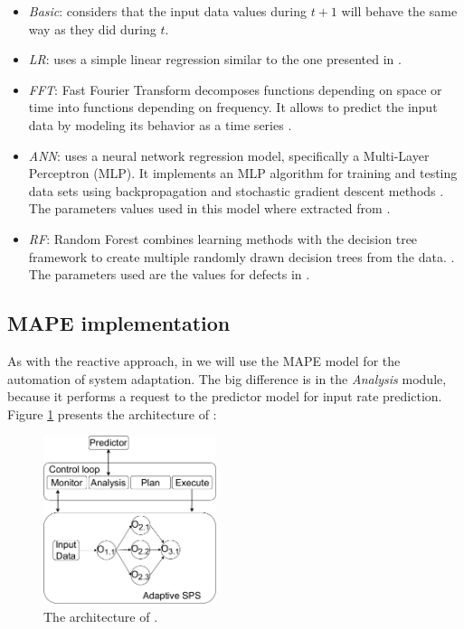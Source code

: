 \begin{itemize}
    \item \textit{Basic}: considers that the input data values during $t+1$ will behave the same way as they did during $t$.
    \item \textit{LR}: uses a simple linear regression similar to the one presented in \citep{montgomery2021introduction}.
    \item \textit{FFT}: Fast Fourier Transform decomposes functions depending on space or time into functions depending on frequency. It allows to predict the input data by modeling its behavior as a time series \citep{nussbaumer1982fast}.
    \item \textit{ANN}: uses a neural network regression model, specifically a Multi-Layer Perceptron (MLP). It implements an MLP algorithm for training and testing data sets using backpropagation and stochastic gradient descent methods \citep{riedmiller2014multi}. The parameters values used in this model where extracted from \citep{PedregosaVGMTGBPWDVPCBPD11}.
    \item \textit{RF}: Random Forest combines learning methods with the decision tree framework to create multiple randomly drawn decision trees from the data. \citep{rigatti2017random}. The parameters used are the values for defects in \citep{PedregosaVGMTGBPWDVPCBPD11}.
\end{itemize}


\subsection{MAPE implementation}
As with the reactive approach, in \pSPS{} we will use the MAPE model for the automation of system adaptation. The big difference is in the \textit{Analysis} module, because it performs a request to the predictor model for input rate prediction. Figure \ref{fig:psps-mape} presents the
architecture of \pSPS{}:

\begin{figure}[!ht]
    \centering
    \includegraphics[width=0.45\textwidth]{figures/concepts/PA-SPS-Architecture.pdf}
    \caption{The architecture of \pSPS{}.}
    \label{fig:psps-mape}
\end{figure}

